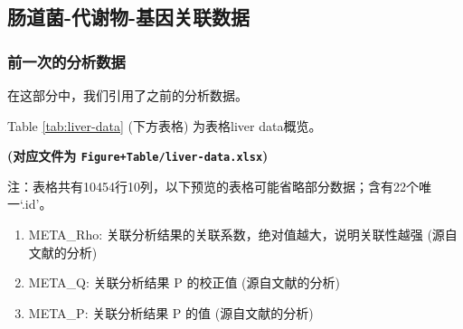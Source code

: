\documentclass[
]{article}
\providecommand{\tightlist}{%
  \setlength{\itemsep}{0pt}\setlength{\parskip}{0pt}}
\begin{document}
\begin{center}\vspace{1.5cm}\end{center}

\hypertarget{ux80a0ux9053ux83cc-ux4ee3ux8c22ux7269-ux57faux56e0ux5173ux8054ux6570ux636e}{%
\subsection{肠道菌-代谢物-基因关联数据}\label{ux80a0ux9053ux83cc-ux4ee3ux8c22ux7269-ux57faux56e0ux5173ux8054ux6570ux636e}}

\hypertarget{ux524dux4e00ux6b21ux7684ux5206ux6790ux6570ux636e}{%
\subsubsection{前一次的分析数据}\label{ux524dux4e00ux6b21ux7684ux5206ux6790ux6570ux636e}}

在这部分中，我们引用了之前的分析数据。

\begin{center}\vspace{1.5cm}\end{center}

Table \ref{tab:liver-data} (下方表格) 为表格liver data概览。

\textbf{(对应文件为 \texttt{Figure+Table/liver-data.xlsx})}

\begin{center}\begin{tcolorbox}[colback=gray!10, colframe=gray!50, width=0.9\linewidth, arc=1mm, boxrule=0.5pt]注：表格共有10454行10列，以下预览的表格可能省略部分数据；含有22个唯一`.id'。
\end{tcolorbox}
\end{center}
\begin{center}\begin{tcolorbox}[colback=gray!10, colframe=gray!50, width=0.9\linewidth, arc=1mm, boxrule=0.5pt]\begin{enumerate}\tightlist
\item META\_Rho:  关联分析结果的关联系数，绝对值越大，说明关联性越强 (源自文献的分析)
\item META\_Q:  关联分析结果 P 的校正值 (源自文献的分析)
\item META\_P:  关联分析结果 P 的值 (源自文献的分析)
\end{enumerate}\end{tcolorbox}
\end{center}
\end{document}
